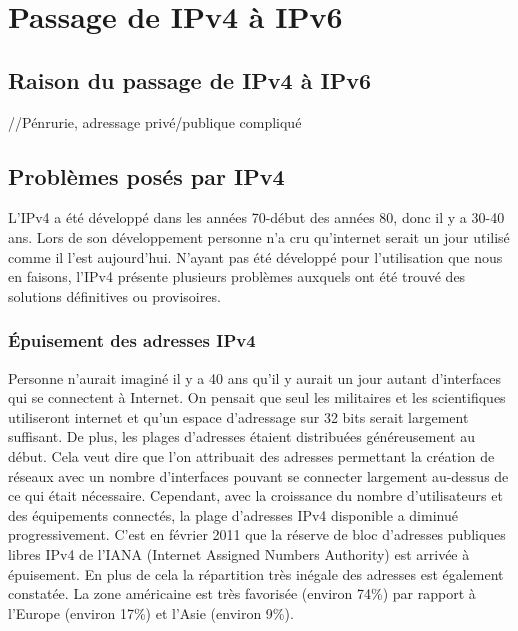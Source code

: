 \section{Passage de IPv4 à IPv6}

\subsection{Raison du passage de IPv4 à IPv6}


//Pénrurie, adressage privé/publique compliqué

\subsection{Problèmes posés par IPv4}
L'IPv4 a été développé dans les années 70-début des années 80, donc il y a 30-40 ans.
Lors de son développement personne n'a cru qu'internet serait un jour utilisé comme il l'est 
aujourd'hui. N'ayant pas été développé pour l'utilisation que nous en faisons, l'IPv4 présente 
plusieurs problèmes auxquels ont été trouvé des solutions définitives ou provisoires.

\subsubsection{Épuisement des adresses IPv4}

Personne n'aurait imaginé il y a 40 ans qu'il y aurait un jour autant d'interfaces qui se connectent à 
Internet. On pensait que seul les militaires et les scientifiques utiliseront 
internet et qu'un espace d'adressage sur 32 bits serait largement suffisant. 
De plus, les plages d'adresses étaient distribuées généreusement au début. 
Cela veut dire que l'on attribuait des adresses permettant la création de réseaux 
avec un nombre d'interfaces pouvant se connecter largement au-dessus de ce qui était 
nécessaire.
Cependant, avec la croissance du nombre d'utilisateurs et des équipements connectés, 
la plage d'adresses IPv4 disponible a diminué progressivement. C'est en février 2011 
que la réserve de bloc d'adresses publiques libres IPv4 de l'IANA (Internet Assigned 
Numbers Authority) est arrivée à épuisement. En plus de cela la répartition très inégale des adresses est également constatée. 
La zone américaine est très favorisée (environ 74\%) par rapport à l'Europe (environ 17\%) et l'Asie (environ 9\%).


